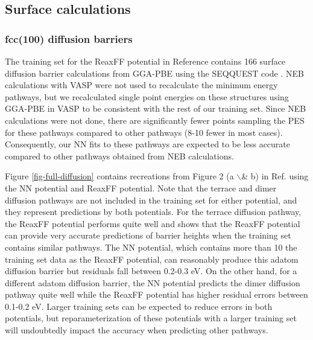 \documentclass[12pt]{cmuthesis}
\begin{document}
\subsection{Surface calculations}
\label{sec:org0a13203}
\subsubsection{fcc(100) diffusion barriers}
\label{sec:org509c737}
The training set for the ReaxFF potential in Reference  contains 166 surface diffusion barrier calculations from GGA-PBE using the SEQQUEST code \cite{schultz-2002-seqques}. NEB calculations with VASP were not used to recalculate the minimum energy pathways, but we recalculated single point energies on these structures using GGA-PBE in VASP to be consistent with the rest of our training set. Since NEB calculations were not done, there are significantly fewer points sampling the PES for these pathways compared to other pathways (8-10\texttimes{} fewer in most cases). Consequently, our NN fits to these pathways are expected to be less accurate compared to other pathways obtained from NEB calculations.

Figure \ref{fig-full-diffusion} contains recreations from Figure 2 (a $\backslash$& b) in Ref.  using the NN potential and ReaxFF potential. Note that the terrace and dimer diffusion pathways are not included in the training set for either potential, and they represent predictions by both potentials. For the terrace diffusion pathway, the ReaxFF potential performs quite well and shows that the ReaxFF potential can provide very accurate predictions of barrier heights when the training set contains similar pathways. The NN potential, which contains more than 10\texttimes{} the training set data as the ReaxFF potential, can reasonably produce this adatom diffusion barrier but residuals fall between 0.2-0.3 eV. On the other hand, for a different adatom diffusion barrier, the NN potential predicts the dimer diffusion pathway quite well while the ReaxFF potential has higher residual errors between 0.1-0.2 eV. Larger training sets can be expected to reduce errors in both potentials, but reparameterization of these potentials with a larger training set will undoubtedly impact the accuracy when predicting other pathways.
\end{document}

